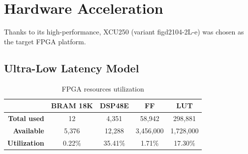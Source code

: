 


\section{Hardware Acceleration}
Thanks to its high-performance, XCU250 (variant figd2104-2L-e) was chosen as the target FPGA platform.




\subsection{Ultra-Low Latency Model}
\indo{|}
\indo{|}
\indo{|}

\indo{|}
\indo{|}

\begin{table}[hpt!]
  \centering
  \caption{FPGA resources utilization}
  \label{tab:utilization}
  \bgroup
  \def\arraystretch{1.3}
  \setlength\tabcolsep{3mm}
  \begin{tabular}{r|c|c|c|c|}
  \cline{2-5}
  \multicolumn{1}{c|}{}                      & \textbf{BRAM 18K} & \textbf{DSP48E} & \textbf{FF} & \textbf{LUT} \\ \hline
  \multicolumn{1}{|r|}{\textbf{Total used}}       & 12                 & 4,351            & 58,942       & 298,881       \\ \hline
  \multicolumn{1}{|r|}{\textbf{Available}}   & 5,376              & 12,288           & 3,456,000     & 1,728,000      \\ \hline\hline
  \multicolumn{1}{|r|}{\textbf{Utilization}} & 0.22\%            & 35.41\%         & 1.71\%      & 17.30\%       \\ \hline
  \end{tabular}
  \egroup
\end{table}

